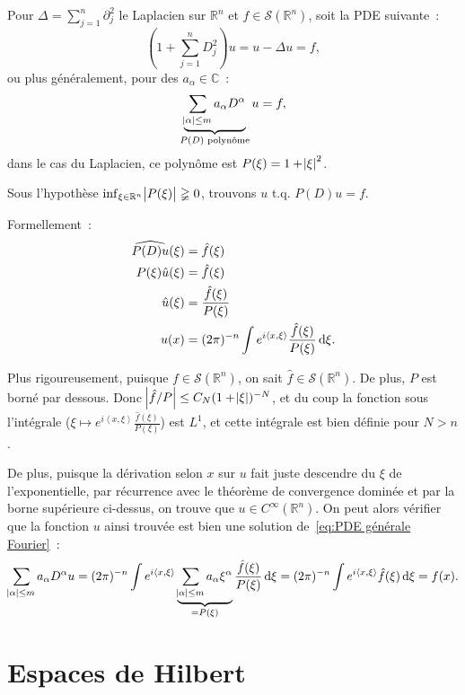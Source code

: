 \documentclass{report}
\newcommand{\C}{{\mathbb C}}
\newcommand{\R}{{\mathbb R}}
\newcommand{\scpr}[2]{\left\langle#1, #2\right\rangle}
\newcommand{\tq}{\text{ t.q. }}
\theoremstyle{definition}
\theoremstyle{remark}
\begin{document}
Pour $\Delta = \sum_{j=1}^n\partial_j^2$ le Laplacien sur $\R^n$ et $f \in \mathcal S(\R^n)$, soit la PDE suivante~:
\begin{equation}
	(1+\sum_{j=1}^nD_j^2)u = u-\Delta u = f,
\end{equation}
ou plus généralement, pour des $a_\alpha \in \C$~:
\begin{equation}\label{eq:PDE générale Fourier}
	\underbrace {\sum_{\abs \alpha \leq m}a_\alpha D^\alpha}_{P(D) \text{ polynôme}} u = f,
\end{equation}
dans le cas du Laplacien, ce polynôme est $P(\xi) = 1+\abs \xi^2$.

Sous l'hypothèse $\inf_{\xi \in \R^n}\abs {P(\xi)} \gneqq 0$, trouvons $u \tq P(D)u = f$.

Formellement~:
\begin{align*}
	\widehat {P(D)u}(\xi) &= \hat f(\xi) \\
	P(\xi)\hat u(\xi) &= \hat f(\xi) \\
	\hat u(\xi) &= \frac {\hat f(\xi)}{P(\xi)} \\
	u(x) &= (2\pi)^{-n}\int e^{i\scpr x\xi}\frac {\hat f(\xi)}{P(\xi)}\dif\xi.
\end{align*}

Plus rigoureusement, puisque $f \in \mathcal S(\R^n)$, on sait $\hat f \in \mathcal S(\R^n)$. De plus, $P$ est borné par dessous. Donc $\abs {\hat f/P} \leq C_N(1+\abs \xi)^{-N}$,
et du coup la fonction sous l'intégrale ($\xi  \mapsto e^{i\scpr x\xi}\frac {\hat f(\xi)}{P(\xi)}$) est $L^1$, et cette intégrale est bien définie pour $N > n$.

De plus, puisque la dérivation selon $x$ sur $u$ fait juste descendre du $\xi$ de l'exponentielle, par récurrence avec le théorème de convergence dominée et par la borne supérieure
ci-dessus, on trouve que $u \in C^\infty(\R^n)$. On peut alors vérifier que la fonction $u$ ainsi trouvée est bien une solution de~\eqref{eq:PDE générale Fourier}~:
\[\sum_{\abs \alpha \leq m}a_\alpha D^\alpha u = (2\pi)^{-n}\int e^{i\scpr x\xi}\underbrace {\sum_{\abs \alpha \leq m}a_\alpha \xi^\alpha}_{=P(\xi)} \frac {\hat f(\xi)}{P(\xi)}\dif\xi
	= (2\pi)^{-n} \int e^{i\scpr x\xi}\hat f(\xi)\dif\xi = f(x).\]

\chapter{Espaces de Hilbert}
\end{document}
